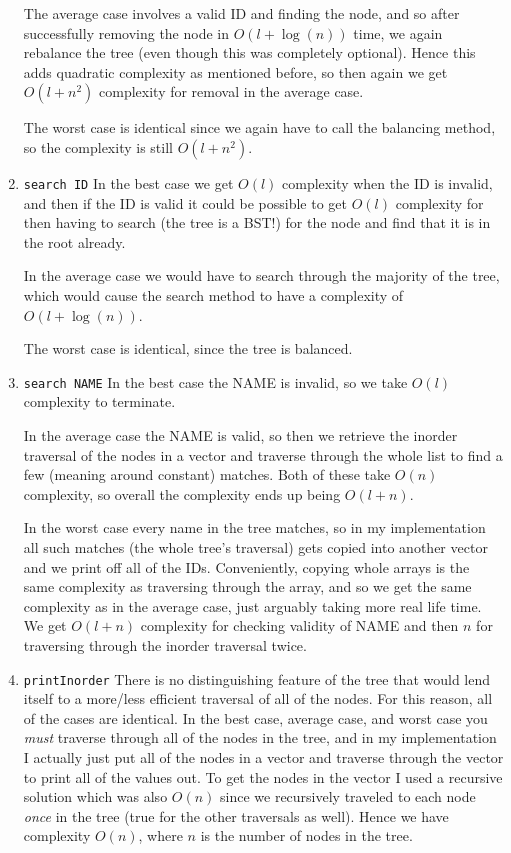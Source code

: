 \documentclass[11pt]{article}
\begin{document}
\begin{enumerate}
  The average case involves a valid ID and finding the node, and so after successfully removing the node in $O(l+\log(n))$ time, we again rebalance the tree (even though this was completely optional). Hence this adds quadratic complexity as mentioned before, so then again we get $O(l+n^2)$ complexity for removal in the average case.

  The worst case is identical since we again have to call the balancing method, so the complexity is still $O(l+n^2)$.
  \item \texttt{search ID} In the best case we get $O(l)$ complexity when the ID is invalid, and then if the ID is valid it could be possible to get $O(l)$ complexity for then having to search (the tree is a BST!) for the node and find that it is in the root already.
  
  In the average case we would have to search through the majority of the tree, which would cause the search method to have a complexity of $O(l+\log(n))$.

  The worst case is identical, since the tree is balanced.
  \item \texttt{search NAME} In the best case the NAME is invalid, so we take $O(l)$ complexity to terminate.
  
  In the average case the NAME is valid, so then we retrieve the inorder traversal of the nodes in a vector and traverse through the whole list to find a few (meaning around constant) matches. Both of these take $O(n)$ complexity, so overall the complexity ends up being $O(l+n)$.

  In the worst case every name in the tree matches, so in my implementation all such matches (the whole tree's traversal) gets copied into another vector and we print off all of the IDs. Conveniently, copying whole arrays is the same complexity as traversing through the array, and so we get the same complexity as in the average case, just arguably taking more real life time. We get $O(l+n)$ complexity for checking validity of NAME and then $n$ for traversing through the inorder traversal twice.

  \item \texttt{printInorder} There is no distinguishing feature of the tree that would lend itself to a more/less efficient traversal of all of the nodes. For this reason, all of the cases are identical. In the best case, average case, and worst case you \textit{must} traverse through all of the nodes in the tree, and in my implementation I actually just put all of the nodes in a vector and traverse through the vector to print all of the values out. To get the nodes in the vector I used a recursive solution which was also $O(n)$ since we recursively traveled to each node \textit{once} in the tree (true for the other traversals as well). Hence we have complexity $O(n)$, where $n$ is the number of nodes in the tree.
  

\end{enumerate}
\end{document}
